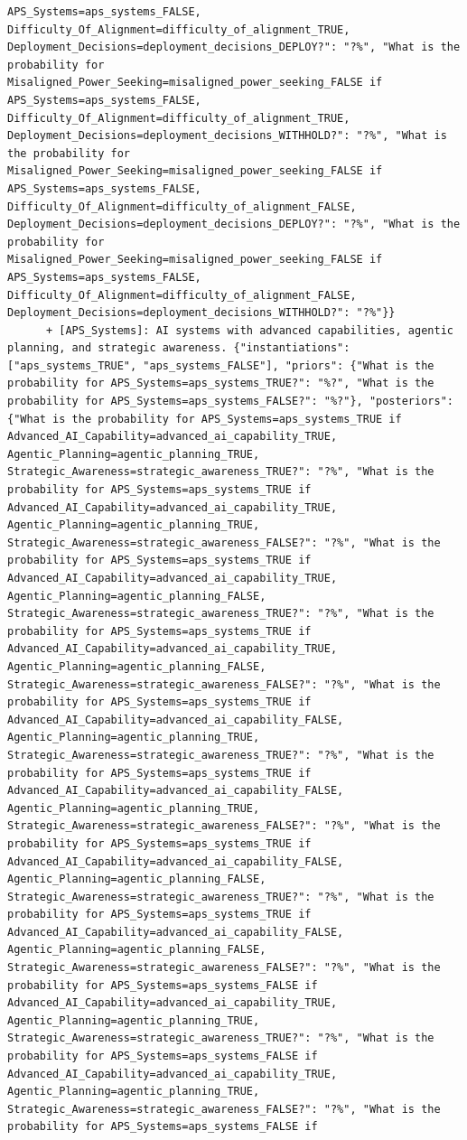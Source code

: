 \documentclass[
  11pt,
  letterpaper,
]{book}
\begin{document}
\begin{verbatim}
APS_Systems=aps_systems_FALSE, Difficulty_Of_Alignment=difficulty_of_alignment_TRUE, Deployment_Decisions=deployment_decisions_DEPLOY?": "?%", "What is the probability for Misaligned_Power_Seeking=misaligned_power_seeking_FALSE if APS_Systems=aps_systems_FALSE, Difficulty_Of_Alignment=difficulty_of_alignment_TRUE, Deployment_Decisions=deployment_decisions_WITHHOLD?": "?%", "What is the probability for Misaligned_Power_Seeking=misaligned_power_seeking_FALSE if APS_Systems=aps_systems_FALSE, Difficulty_Of_Alignment=difficulty_of_alignment_FALSE, Deployment_Decisions=deployment_decisions_DEPLOY?": "?%", "What is the probability for Misaligned_Power_Seeking=misaligned_power_seeking_FALSE if APS_Systems=aps_systems_FALSE, Difficulty_Of_Alignment=difficulty_of_alignment_FALSE, Deployment_Decisions=deployment_decisions_WITHHOLD?": "?%"}}
      + [APS_Systems]: AI systems with advanced capabilities, agentic planning, and strategic awareness. {"instantiations": ["aps_systems_TRUE", "aps_systems_FALSE"], "priors": {"What is the probability for APS_Systems=aps_systems_TRUE?": "%?", "What is the probability for APS_Systems=aps_systems_FALSE?": "%?"}, "posteriors": {"What is the probability for APS_Systems=aps_systems_TRUE if Advanced_AI_Capability=advanced_ai_capability_TRUE, Agentic_Planning=agentic_planning_TRUE, Strategic_Awareness=strategic_awareness_TRUE?": "?%", "What is the probability for APS_Systems=aps_systems_TRUE if Advanced_AI_Capability=advanced_ai_capability_TRUE, Agentic_Planning=agentic_planning_TRUE, Strategic_Awareness=strategic_awareness_FALSE?": "?%", "What is the probability for APS_Systems=aps_systems_TRUE if Advanced_AI_Capability=advanced_ai_capability_TRUE, Agentic_Planning=agentic_planning_FALSE, Strategic_Awareness=strategic_awareness_TRUE?": "?%", "What is the probability for APS_Systems=aps_systems_TRUE if Advanced_AI_Capability=advanced_ai_capability_TRUE, Agentic_Planning=agentic_planning_FALSE, Strategic_Awareness=strategic_awareness_FALSE?": "?%", "What is the probability for APS_Systems=aps_systems_TRUE if Advanced_AI_Capability=advanced_ai_capability_FALSE, Agentic_Planning=agentic_planning_TRUE, Strategic_Awareness=strategic_awareness_TRUE?": "?%", "What is the probability for APS_Systems=aps_systems_TRUE if Advanced_AI_Capability=advanced_ai_capability_FALSE, Agentic_Planning=agentic_planning_TRUE, Strategic_Awareness=strategic_awareness_FALSE?": "?%", "What is the probability for APS_Systems=aps_systems_TRUE if Advanced_AI_Capability=advanced_ai_capability_FALSE, Agentic_Planning=agentic_planning_FALSE, Strategic_Awareness=strategic_awareness_TRUE?": "?%", "What is the probability for APS_Systems=aps_systems_TRUE if Advanced_AI_Capability=advanced_ai_capability_FALSE, Agentic_Planning=agentic_planning_FALSE, Strategic_Awareness=strategic_awareness_FALSE?": "?%", "What is the probability for APS_Systems=aps_systems_FALSE if Advanced_AI_Capability=advanced_ai_capability_TRUE, Agentic_Planning=agentic_planning_TRUE, Strategic_Awareness=strategic_awareness_TRUE?": "?%", "What is the probability for APS_Systems=aps_systems_FALSE if Advanced_AI_Capability=advanced_ai_capability_TRUE, Agentic_Planning=agentic_planning_TRUE, Strategic_Awareness=strategic_awareness_FALSE?": "?%", "What is the probability for APS_Systems=aps_systems_FALSE if 
\end{verbatim}
\end{document}
